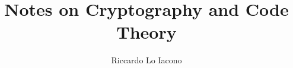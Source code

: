 \title{Notes on Cryptography and Code Theory}
\author{Riccardo Lo Iacono}
\institute{}

\usepackage{etextools}
\usepackage{mathtools,amsfonts,amssymb}
\usepackage{cleveref}
\usepackage{subfiles}
\usepackage{xfrac}
\sloppy

\newcommand\nset{\mathbb{N}}
\newcommand\zset{\mathbb{Z}}
\newcommand\K{\mathcal{K}}


\DeclareMathOperator\gf{GF}
\DeclareMathOperator\ps{\mathbb{P}}

\newcommand\gen[1]{\langle #1 \rangle}
\newcommand\set[2][]{\lbrace #2 \ifnotempty{#1}{\: | \: #1}{} \rbrace}
